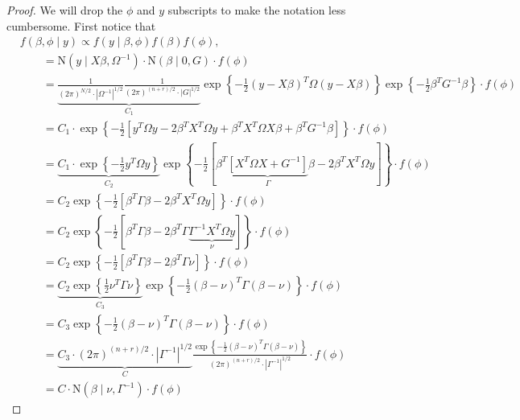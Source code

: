 \documentclass[10pt]{article}
\begin{document}
\begin{proof}
We will drop the $\phi$ and $y$ subscripts to make the notation less cumbersome. First notice that
%
\begin{align}
&f(\beta, \phi \mid y) \propto f(y \mid \beta, \phi) f(\beta) f(\phi), \nonumber \\
&\qquad= \text{N}(y \mid X \beta, \Omega^{-1}) \cdot \text{N}(\beta \mid 0, G) \cdot f(\phi) \nonumber \\
%
&\qquad= \underbrace{\frac{1}{ (2\pi)^{N/2} \cdot |\Omega^{-1}|^{1/2}}
\frac{1}{ (2\pi)^{(n+r)/2} \cdot |G|^{1/2}}}_{C_1}
\exp\left\{ -\frac{1}{2} (y - X \beta)^T \Omega (y - X \beta) \right\}
\exp\left\{ -\frac{1}{2} \beta^T G^{-1} \beta \right\}
\cdot f(\phi) \nonumber \\
%
&\qquad= C_1 \cdot
\exp\left\{ -\frac{1}{2} \left[ y^T \Omega y - 2 \beta^T X^T \Omega y + \beta^T X^T \Omega X \beta + \beta^T G^{-1} \beta\right] \right\}
\cdot f(\phi) \nonumber \\
%
&\qquad= \underbrace{C_1 \cdot \exp\left\{ -\frac{1}{2} y^T \Omega y \right\}}_{C_2}
\exp\left\{ -\frac{1}{2} \left[ \beta^T \underbrace{[X^T \Omega X + G^{-1}]}_{\Gamma} \beta - 2 \beta^T X^T \Omega y \right] \right\}
\cdot f(\phi) \nonumber \\
%
&\qquad= C_2
\exp\left\{ -\frac{1}{2} \left[ \beta^T \Gamma \beta - 2 \beta^T X^T \Omega y \right] \right\}
\cdot f(\phi) \nonumber \\
%
&\qquad= C_2
\exp\left\{ -\frac{1}{2} \left[ \beta^T \Gamma \beta - 2 \beta^T \Gamma \underbrace{\Gamma^{-1} X^T \Omega y}_{\nu} \right] \right\}
\cdot f(\phi) \nonumber \\
%
&\qquad= C_2
\exp\left\{ -\frac{1}{2} \left[ \beta^T \Gamma \beta - 2 \beta^T \Gamma \nu \right] \right\}
\cdot f(\phi) \nonumber \\
%
&\qquad= \underbrace{C_2 \exp\left\{ \frac{1}{2} \nu^T \Gamma \nu \right\}}_{C_3}
\exp\left\{ -\frac{1}{2} (\beta - \nu)^T \Gamma (\beta - \nu) \right\}
\cdot f(\phi) \nonumber \\
%
&\qquad= C_3
\exp\left\{ -\frac{1}{2} (\beta - \nu)^T \Gamma (\beta - \nu) \right\}
\cdot f(\phi) \nonumber \\
%
&\qquad= \underbrace{C_3 \cdot (2\pi)^{(n+r)/2} \cdot |\Gamma^{-1}|^{1/2}}_{C}
\frac{ \exp\left\{ -\frac{1}{2} (\beta - \nu)^T \Gamma (\beta - \nu) \right\} }{ (2\pi)^{(n+r)/2} \cdot |\Gamma^{-1}|^{1/2} }
\cdot f(\phi) \nonumber \\
%
&\qquad= C \cdot
\text{N}(\beta \mid \nu, \Gamma^{-1})
\cdot f(\phi)
\label{eqn:factoring}

\end{align}
\end{proof}
\end{document}
